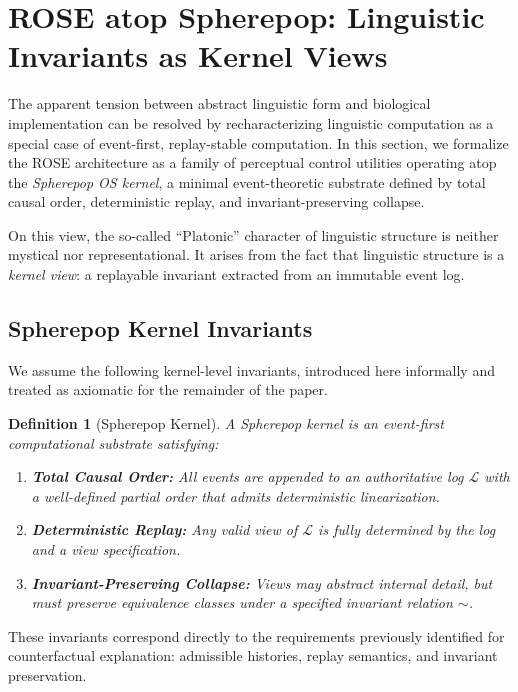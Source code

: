 \documentclass[11pt]{article}
\newtheorem{definition}{Definition}
\begin{document}
\section{ROSE atop Spherepop: Linguistic Invariants as Kernel Views}
\label{sec:rose_spherepop}

The apparent tension between abstract linguistic form and biological implementation can be resolved by recharacterizing linguistic computation as a special case of event-first, replay-stable computation. In this section, we formalize the ROSE architecture as a family of perceptual control utilities operating atop the \emph{Spherepop OS kernel}, a minimal event-theoretic substrate defined by total causal order, deterministic replay, and invariant-preserving collapse.

On this view, the so-called “Platonic” character of linguistic structure is neither mystical nor representational. It arises from the fact that linguistic structure is a \emph{kernel view}: a replayable invariant extracted from an immutable event log.

\subsection{Spherepop Kernel Invariants}

We assume the following kernel-level invariants, introduced here informally and treated as axiomatic for the remainder of the paper.

\begin{definition}[Spherepop Kernel]
A \emph{Spherepop kernel} is an event-first computational substrate satisfying:
\begin{enumerate}
  \item \textbf{Total Causal Order:} All events are appended to an authoritative log $\mathcal{L}$ with a well-defined partial order that admits deterministic linearization.
  \item \textbf{Deterministic Replay:} Any valid view of $\mathcal{L}$ is fully determined by the log and a view specification.
  \item \textbf{Invariant-Preserving Collapse:} Views may abstract internal detail, but must preserve equivalence classes under a specified invariant relation $\sim$.
\end{enumerate}
\end{definition}

These invariants correspond directly to the requirements previously identified for counterfactual explanation: admissible histories, replay semantics, and invariant preservation.
\end{document}
